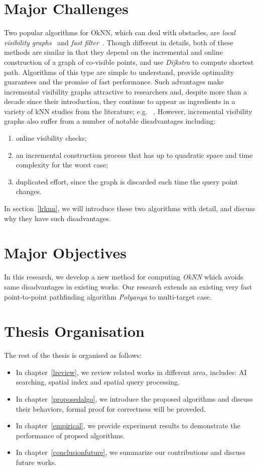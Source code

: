 \section{Major Challenges}
Two popular algorithms for OkNN, which can deal with obstacles, are
\emph{local visibility graphs}~\cite{zhang2004spatial} and \emph{fast
filter}~\cite{xia2004fast}. Though different in details, both of these methods
are similar in that they depend on the incremental and online construction of 
a graph of co-visible points, and use \textit{Dijkstra} to compute shortest path.
Algorithms of this type are simple to understand, 
provide optimality guarantees and the promise of fast performance. 
Such advantages make incremental visibility graphs attractive to researchers 
and, despite more than a decade since their introduction, they continue to 
appear as ingredients in a variety of kNN studies from the literature; e.g. 
~\cite{gao2011efficient,gao2016reverse,gao2009continuous}.
However, incremental visibility graphs also suffer from a number of notable 
disadvantages including:

\begin{enumerate}
  \item online visibility checks;
  \item an incremental construction process that has up to quadratic space and time complexity for the worst case;
  \item duplicated effort, since the graph is discarded each time the query 
  point changes.
\end{enumerate}

In section~\ref{lrknn}, we will introduce these two algorithms with detail,
and discuss why they have such disadvantages.

\section{Major Objectives}
In this research, we develop a new method for computing \emph{OkNN} which avoids same
disadvantages in existing works. Our research extends an existing very fast point-to-point
pathfinding algorithm \emph{Polyanya} to multi-target case.

\section{Thesis Organisation}
The rest of the thesis is organised as follows:
\begin{itemize}
  \item In chapter~\ref{lreview}, we review related works in different area, includes: AI
    searching, spatial index and spatial query processing.
  \item In chapter~\ref{proposedalgo}, we introduce the proposed algorithms and discuss their
    behaviors, formal proof for correctness will be proveded.
  \item In chapter~\ref{empirical}, we provide experiment results to demonstrate the
    performance of propsed algorithms.
  \item In chapter~\ref{conclusionfuture}, we summarize our contributions and discuss future
    works.
\end{itemize}
